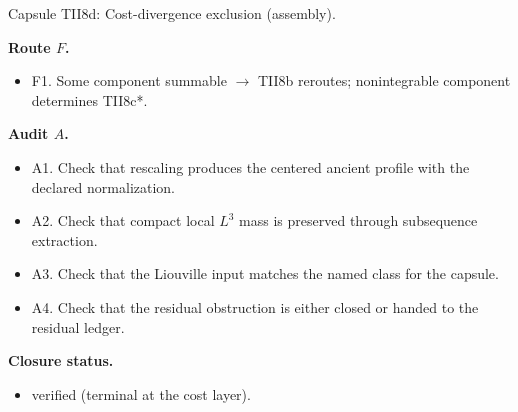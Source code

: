 \documentclass[11pt]{amsart}
\newcommand{\capsulefield}[1]{\par\smallskip\noindent\textbf{#1.}\ }
\begin{document}
\begin{proofcapsule}{Capsule TII8d: Cost-divergence exclusion (assembly).}
  \capsulefield{Route \(F\)}
  \begin{itemize}[leftmargin=1.8em]
  \item F1. Some component summable $\to$ TII8b reroutes; nonintegrable component determines TII8c*.
  \end{itemize}

  \capsulefield{Audit \(A\)}
  \begin{itemize}[leftmargin=1.8em]
  \item A1. Check that rescaling produces the centered ancient profile with the declared normalization.
  \item A2. Check that compact local $L^3$ mass is preserved through subsequence extraction.
  \item A3. Check that the Liouville input matches the named class for the capsule.
  \item A4. Check that the residual obstruction is either closed or handed to the residual ledger.
  \end{itemize}
  \capsulefield{Closure status}
  \begin{itemize}[leftmargin=1.8em]
  \item verified (terminal at the cost layer).
  \end{itemize}
\end{proofcapsule}
\end{document}
